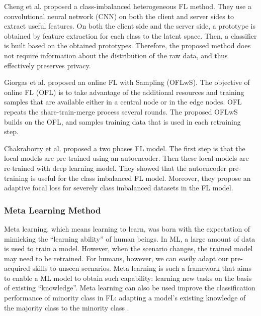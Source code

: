 \documentclass[10pt,journal,compsoc]{IEEEtran}
\begin{document}
Cheng et al. \cite{cheng2022class} proposed a class-imbalanced heterogeneous FL method. They use a convolutional neural network (CNN) on both the client and server sides to extract useful features. On both the client side and the server side, a prototype is obtained by feature extraction for each class to the latent space. Then, a classifier is built based on the obtained prototypes. Therefore, the proposed method does not require information about the distribution of the raw data, and thus effectively preserves privacy.  

Giorgas et al. \cite{giorgas2020online} proposed an online FL with Sampling (OFLwS). The objective of online FL (OFL) \cite{yang2019federated} is to take advantage of the additional resources and training samples that are available either in a central node or in the edge nodes. OFL repeats the share-train-merge process several rounds. The proposed OFLwS builds on the OFL, and samples training data that is used in each retraining step. 

Chakraborty et al. \cite{chakraborty2022improving} proposed a two phases FL model. The first step is that the local models are pre-trained using an autoencoder. Then these local models are re-trained with deep learning model. They showed that the autoencoder pre-training is useful for the class imbalanced FL model. Moreover, they propose an adaptive focal loss for severely class imbalanced datasets in the FL model.
\vspace{-0.2cm}

\subsubsection{Meta Learning Method}
Meta learning, which means learning to learn, was born with the expectation of mimicking the ``learning ability'' of human beings. In ML, a large amount of data is used to train a model. However, when the scenario changes, the trained model may need to be retrained. For humans, however, we can easily adapt our pre-acquired skills to unseen scenarios. Meta learning is such a framework that aims to enable a ML model to obtain such capability: learning new tasks on the basis of existing ``knowledge''. Meta learning can also be used improve the classification performance of minority class in FL: adapting a model's existing knowledge of the majority class to the minority class \cite{zheng2021federated} \cite{zheng2020novel}.
\vspace{-0.3cm}
\end{document}
